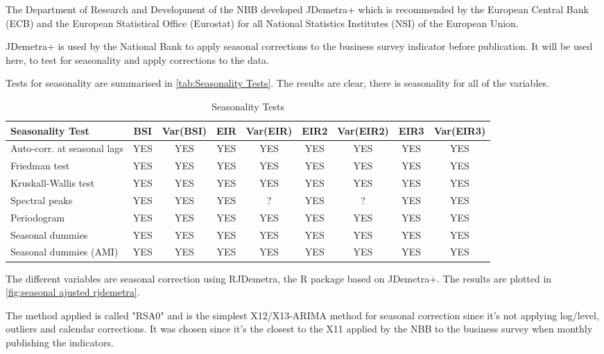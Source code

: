 \documentclass[12pt,a4paper,oneside]{book}
\begin{document}
The Department of Research and Development of the NBB developed JDemetra+ which is recommended by the European Central Bank (ECB) and the European Statistical Office (Eurostat) for all National Statistics Institutes (NSI) of the European Union. 

JDemetra+ is used by the National Bank to apply seasonal corrections to the business survey indicator before publication. It will be used here, to test for seasonality and apply corrections to the data.

Tests for seasonality are summarised in \autoref{tab:Seasonality Tests}. The results are clear, there is seasonality for all of the variables.

\begin{table}[htp!]
    \centering \footnotesize
    \begin{tabular}{l|c|c|c|c|c|c|c|c}
\textbf{Seasonality Test} & BSI & Var(BSI) & EIR & Var(EIR) & EIR2 & Var(EIR2) & EIR3 & Var(EIR3) \\ \hline
Auto-corr. at seasonal lags& YES & YES & YES & YES & YES & YES & YES & YES \\
Friedman test       & YES   & YES & YES & YES & YES & YES & YES & YES \\
Kruskall-Wallis test & YES   & YES & YES & YES & YES & YES & YES & YES \\
Spectral peaks                  & YES   & YES & YES & ? & YES & ? & YES & YES \\
Periodogram                     & YES   & YES & YES & YES & YES & YES & YES & YES \\
Seasonal dummies                & YES   & YES & YES & YES & YES & YES & YES & YES \\
Seasonal dummies (AMI)          & YES   & YES & YES & YES & YES & YES & YES & YES \\
    \end{tabular}
    \caption{Seasonality Tests}
    \label{tab:Seasonality Tests}
\end{table}



The different variables are seasonal correction using RJDemetra, the R package based on JDemetra+.
The results are plotted in \autoref{fig:seasonal ajusted rjdemetra}.

The method applied is called "RSA0" and is the simplest X12/X13-ARIMA method for seasonal correction since it's not applying log/level, outliers and calendar corrections. 
It was chosen since it's the closest to the X11 applied by the NBB to the business survey when monthly publishing the indicators.
\end{document}
